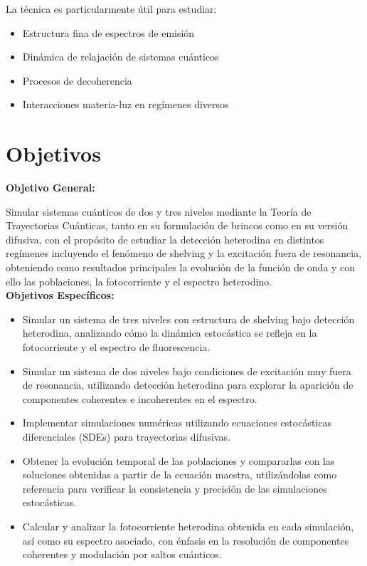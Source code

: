 \documentclass[12pt]{report}
\begin{document}
La técnica es particularmente útil para estudiar:

\begin{itemize}
\item Estructura fina de espectros de emisión
\item Dinámica de relajación de sistemas cuánticos
\item Procesos de decoherencia
\item Interacciones materia-luz en regímenes diversos
\end{itemize}


\section*{Objetivos}
\textbf{Objetivo General:}

Simular sistemas cuánticos de dos y tres niveles mediante la Teoría de Trayectorias Cuánticas, tanto en su formulación de brincos como en su versión difusiva, con el propósito de estudiar la detección heterodina en distintos regímenes incluyendo el fenómeno de shelving y la excitación fuera de resonancia, obteniendo como resultados principales la evolución de la función de onda y con ello las poblaciones, la fotocorriente y el espectro heterodino.\\

\textbf{Objetivos Específicos:}
\begin{itemize}
    \item Simular un sistema de tres niveles con estructura de shelving bajo detección heterodina, analizando cómo la dinámica estocástica se refleja en la fotocorriente y el espectro de fluorescencia.
    \item Simular un sistema de dos niveles bajo condiciones de excitación muy fuera de resonancia, utilizando detección heterodina para explorar la aparición de componentes coherentes e incoherentes en el espectro.
    \item Implementar simulaciones numéricas utilizando  ecuaciones estocásticas diferenciales (SDEs) para trayectorias difusivas.
    \item Obtener la evolución temporal de las poblaciones y compararlas con las soluciones obtenidas a partir de la ecuación maestra, utilizándolas como referencia para verificar la consistencia y precisión de las simulaciones estocásticas.
    \item Calcular y analizar la fotocorriente heterodina obtenida en cada simulación, así como su espectro asociado, con énfasis en la resolución de componentes coherentes y modulación por saltos cuánticos.
\end{itemize}
\end{document}
